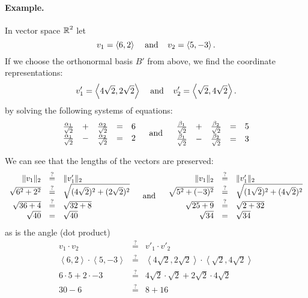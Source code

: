 \paragraph{Example.}
In vector space $\operatorname{\mathbb{R}}^2$ let \[v_1 = \left\langle6,2\right\rangle\;\;\;\;\textnormal{and}\;\;\;\; v_2 = \left\langle5,-3\right\rangle.\]
If we choose the orthonormal basis  $B'$ from above, 
we find the coordinate representations:
\[
v'_1 = \left\langle4\sqrt{2},2\sqrt{2}\right\rangle \;\;\;\;\textnormal{and}\;\;\;\; v'_2 = \left\langle\sqrt{2},4\sqrt{2}\right\rangle.
\]
by solving the following systems of equations: 
\[
\begin{array}{rcrcr}
\frac{\alpha_1}{\sqrt{2}} &+& \frac{\alpha_2}{\sqrt{2}} &=& 6\\
\frac{\alpha_1}{\sqrt{2}} &-& \frac{\alpha_2}{\sqrt{2}} &=& 2\\ 
\end{array} \;\;\;\;\textnormal{and}\;\;\;\; \begin{array}{rcrcr}
\frac{\beta_1}{\sqrt{2}} &+& \frac{\beta_2}{\sqrt{2}} &=& 5\\
\frac{\beta_1}{\sqrt{2}} &-& \frac{\beta_2}{\sqrt{2}} &=& 3\\ 
\end{array}\]

We can see that the lengths of the vectors are preserved: 
\[
\begin{array}{rcl}
\|v_1\|_2 & \stackrel{?}{=} & \|v'_1\|_2\\
\sqrt{6^2+2^2} & \stackrel{?}{=} & \sqrt{(4\sqrt{2})^2+(2\sqrt{2})^2}\\
\sqrt{36+4} & \stackrel{?}{=} & \sqrt{32 + 8}\\
\sqrt{40} & = & \sqrt{40}\\
\end{array}\;\;\;\;\textnormal{and}\;\;\;\; 
\begin{array}{rcl}
\|v_1\|_2 & \stackrel{?}{=} & \|v'_1\|_2\\
\sqrt{5^2+(-3)^2} & \stackrel{?}{=} & \sqrt{(1\sqrt{2})^2+(4\sqrt{2})^2}\\
\sqrt{25+9} & \stackrel{?}{=} & \sqrt{2 + 32}\\
\sqrt{34} & = & \sqrt{34}\\
\end{array} 
\]
as is the angle (dot product)
\[\begin{array}{rcl}
v_1 \cdot v_2 & \stackrel{?}{=} & v'_1 \cdot v'_2 \\
\left\langle6,2\right\rangle\cdot \left\langle5,-3\right\rangle&  \stackrel{?}{=}  & \left\langle4\sqrt{2},2\sqrt{2}\right\rangle\cdot\left\langle\sqrt{2},4\sqrt{2}\right\rangle\\
6\cdot5+2\cdot-3&  \stackrel{?}{=}  & 4\sqrt{2}\cdot\sqrt{2}+2\sqrt{2}\cdot4\sqrt{2}\\
30-6 &  \stackrel{?}{=}  & 8 + 16\\

\end{array} 
\]

